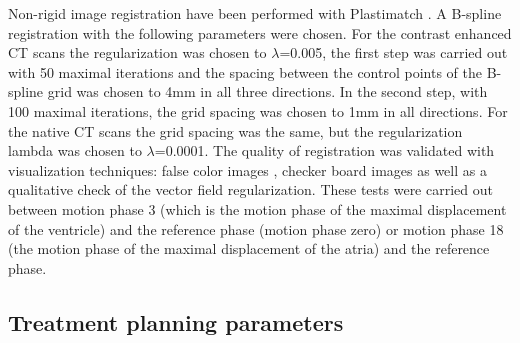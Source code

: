 \documentclass[type=dr, dr=rernat, accentcolor=tud7b,colorbacktitle, bigchapter, openright, twoside, 12pt ]{tudthesis}
\begin{document}



Non-rigid image registration have been performed with Plastimatch \cite{Sharp07} \cite{Shack10}. 
A B-spline registration with the following parameters were chosen. For the contrast enhanced CT scans the regularization was chosen to 
$\lambda$=0.005, the first step was carried out with 50 maximal iterations and the spacing between the control points of the B-spline grid was 
chosen to 4mm in all three directions. In the second step, with 100 maximal iterations, the grid spacing was chosen to 1mm in all directions. 
For the native CT scans the grid spacing was the same, but the regularization lambda was chosen to $\lambda$=0.0001. 
The quality of registration was validated with visualization techniques: false color images \cite{Bro07}, checker board images 
\cite{Bro07} as well as a qualitative check of the vector field regularization. These tests were carried out between motion phase 3 
(which is the motion phase of the maximal displacement of the ventricle) and  the reference phase (motion phase zero) or motion 
phase 18 (the motion phase of the maximal displacement of the atria) and the reference phase.  

\subsection{Treatment planning parameters}
\end{document}
